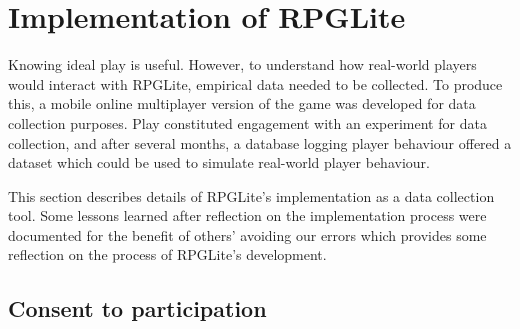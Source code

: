 
\section{Implementation of RPGLite}\label{sec:rpglite_implementation}

Knowing ideal play is useful. However, to understand how real-world players
would interact with RPGLite, empirical data needed to be collected. To produce
this, a mobile online multiplayer version of the game was developed for data
collection purposes. Play constituted engagement with an experiment for data
collection, and after several months, a database logging player behaviour
offered a dataset which could be used to simulate real-world player behaviour.

This section describes details of RPGLite's implementation as a data collection
tool. Some lessons learned after reflection on the implementation process were
documented for the benefit of others' avoiding our
errors\cite{RPGLiteLessonsLearned} which provides some reflection on the process
of RPGLite's development.

\subsection{Consent to participation}\label{subsec:consent_to_participation}


